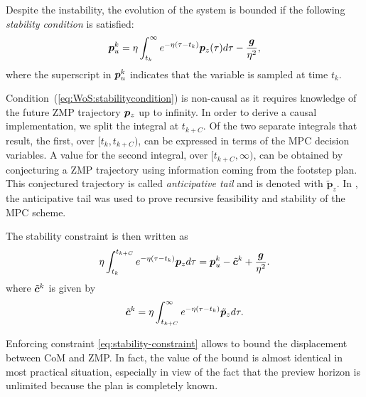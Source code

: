 Despite the instability, the evolution of the system is bounded if the
following \emph{stability condition} \cite{Lanari2015Inversionbasedgaitgeneration}
is satisfied:
\begin{equation}
\label{eq:WoS:stabilitycondition}
{\bm{p}}_u^k = \eta\int_{t_k}^{\infty}e^{-\eta(\tau - t_k)}{\bm{p}}_z(\tau) d\tau - \frac{{\bm{g}}}{\eta^2},
\end{equation}
where the superscript in ${{\bm{p}}}_u^k$ indicates that the variable is sampled
at time $t_k$.

Condition~(\ref{eq:WoS:stabilitycondition}) is non-causal as it requires
knowledge of the future ZMP trajectory ${\bm{p}}_z$ up to infinity.
In order to derive a causal implementation, we split the integral at $t_{k+C}$.
Of the two separate integrals that result, the first, over $[t_k, t_{k+C})$,
can be expressed in terms of the MPC decision variables.
A value for the second integral, over $[t_{k+C}, \infty)$, can be obtained by
conjecturing a ZMP trajectory using information coming from the footstep plan.
This conjectured trajectory is called \emph{anticipative tail} and is denoted
with $\tilde{\bm{p}}_z$. 
In \cite{Scianca2020TRO}, the anticipative tail was used to prove recursive
feasibility and stability of the MPC scheme.

The stability constraint is then written as
\begin{equation}
    \label{eq:stability-constraint}
    \eta\int_{t_k}^{t_{k+C}}e^{-\eta(\tau - t_k)}{\bm{p}}_z d\tau = {\bm{p}}_u^k - \tilde {{\bm{c}}}^k + \frac{{\bm{g}}}{\eta^2}.
\end{equation}
where $\tilde {{\bm{c}}}^k$ is given by
\begin{equation}
\tilde{{\bm{c}}}^k = \eta\int_{t_{k+C}}^{\infty}e^{-\eta(\tau - t_k)}\tilde{{\bm{p}}}_z d\tau.
\end{equation}

Enforcing constraint \eqref{eq:stability-constraint} allows to bound the
displacement between CoM and ZMP. In fact, the value of the bound is almost
identical in most practical situation, especially in view of the fact that the
preview horizon is unlimited because the plan is completely known.

